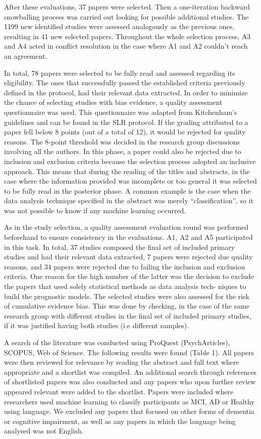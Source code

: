 \documentclass[12pt]{article}
\begin{document}
After these evaluations, 37 papers were selected. Then a one-iteration backward snowballing process was carried out looking for possible additional studies. The 1199 new identified studies were assessed analogously as the previous ones, resulting in 41 new selected papers. Throughout the whole selection process, A3 and A4 acted in conflict resolution in the case where A1 and A2 couldn’t reach an agreement.
\par 
In total, 78 papers were selected to be fully read and assessed regarding its eligibility. The ones that successfully passed the established criteria previously defined in the protocol, had their relevant data extracted. In order to minimize the chance of selecting studies with bias evidence, a quality assessment questionnaire was used. This questionnaire was adapted from Kitchenham’s guidelines and can be found in the SLR protocol. If the grading attributed to a paper fell below 8 points (out of a total of 12), it would be rejected for quality reasons. The 8-point threshold was
decided in the research group discussions involving all the authors. In this phase, a paper could also be rejected due to inclusion and exclusion criteria because the selection process adopted an inclusive approach. This means that during the reading of the titles and abstracts, in the case where the information provided was incomplete or too general it was selected to be fully read in the posterior phase. A common example is the case when the data analysis technique specified in the abstract was merely “classification”, so it was not possible to know if any machine learning occurred.
\par
As in the study selection, a quality assessment evaluation round was performed beforehand to ensure consistency in the evaluations. A1, A2 and A5 participated in this task. In total, 37 studies composed the final set of included primary studies and had their relevant data extracted, 7 papers were rejected due quality reasons, and 34 papers were rejected due to failing the inclusion and exclusion criteria. One reason for the high number of the latter was the decision to exclude the papers that used solely statistical methods as data analysis tech- niques to build the prognostic models. The selected studies were also assessed for the risk of cumulative evidence bias. This was done by checking, in the case of the same research group with different studies in the final set of included primary studies, if it was justified having both studies (i.e different samples).

A search of the literature was conducted using ProQuest (PsychArticles), SCOPUS, Web of Science. The following results were found (Table 1). All papers were then reviewed for relevance by reading the abstract and full text where appropriate and a shortlist was compiled. An additional search through references of shortlisted papers was also conducted and any papers who upon further review appeared relevant were added to the shortlist. Papers were included where researchers used machine learning to classify participants as MCI, AD or Healthy using language. We excluded any papers that focused on other forms of dementia or cognitive impairment, as well as any papers in which the language being analysed was not English. 
\end{document}
